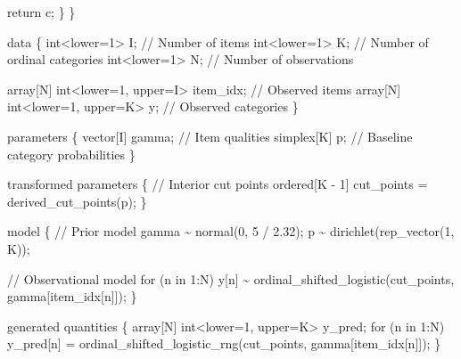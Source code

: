 \documentclass[
  letterpaper,
  DIV=11,
  numbers=noendperiod]{scrartcl}
\newenvironment{Shaded}{\begin{snugshade}}{\end{snugshade}}
\newcommand{\CommentTok}[1]{\textcolor[rgb]{0.37,0.37,0.37}{#1}}
\newcommand{\ControlFlowTok}[1]{\textcolor[rgb]{0.00,0.23,0.31}{#1}}
\newcommand{\DataTypeTok}[1]{\textcolor[rgb]{0.68,0.00,0.00}{#1}}
\newcommand{\DecValTok}[1]{\textcolor[rgb]{0.68,0.00,0.00}{#1}}
\newcommand{\FloatTok}[1]{\textcolor[rgb]{0.68,0.00,0.00}{#1}}
\newcommand{\KeywordTok}[1]{\textcolor[rgb]{0.00,0.23,0.31}{#1}}
\newcommand{\NormalTok}[1]{\textcolor[rgb]{0.00,0.23,0.31}{#1}}
\begin{document}
\begin{codelisting}
\begin{Shaded}
\begin{Highlighting}[]
    \ControlFlowTok{return}\NormalTok{ c;}
\NormalTok{  \}}
\NormalTok{\}}

\KeywordTok{data}\NormalTok{ \{}
  \DataTypeTok{int}\NormalTok{\textless{}}\KeywordTok{lower}\NormalTok{=}\DecValTok{1}\NormalTok{\textgreater{} I; }\CommentTok{// Number of items}
  \DataTypeTok{int}\NormalTok{\textless{}}\KeywordTok{lower}\NormalTok{=}\DecValTok{1}\NormalTok{\textgreater{} K; }\CommentTok{// Number of ordinal categories}
  \DataTypeTok{int}\NormalTok{\textless{}}\KeywordTok{lower}\NormalTok{=}\DecValTok{1}\NormalTok{\textgreater{} N; }\CommentTok{// Number of observations}

  \DataTypeTok{array}\NormalTok{[N] }\DataTypeTok{int}\NormalTok{\textless{}}\KeywordTok{lower}\NormalTok{=}\DecValTok{1}\NormalTok{, }\KeywordTok{upper}\NormalTok{=I\textgreater{} item\_idx; }\CommentTok{// Observed items}
  \DataTypeTok{array}\NormalTok{[N] }\DataTypeTok{int}\NormalTok{\textless{}}\KeywordTok{lower}\NormalTok{=}\DecValTok{1}\NormalTok{, }\KeywordTok{upper}\NormalTok{=K\textgreater{} y;        }\CommentTok{// Observed categories}
\NormalTok{\}}

\KeywordTok{parameters}\NormalTok{ \{}
  \DataTypeTok{vector}\NormalTok{[I] gamma; }\CommentTok{// Item qualities}
  \DataTypeTok{simplex}\NormalTok{[K] p;    }\CommentTok{// Baseline category probabilities}
\NormalTok{\}}

\KeywordTok{transformed parameters}\NormalTok{ \{}
  \CommentTok{// Interior cut points}
  \DataTypeTok{ordered}\NormalTok{[K {-} }\DecValTok{1}\NormalTok{] cut\_points = derived\_cut\_points(p);}
\NormalTok{\}}

\KeywordTok{model}\NormalTok{ \{}
  \CommentTok{// Prior model}
\NormalTok{  gamma \textasciitilde{} normal(}\DecValTok{0}\NormalTok{, }\DecValTok{5}\NormalTok{ / }\FloatTok{2.32}\NormalTok{);}
\NormalTok{  p \textasciitilde{} dirichlet(rep\_vector(}\DecValTok{1}\NormalTok{, K));}

  \CommentTok{// Observational model}
  \ControlFlowTok{for}\NormalTok{ (n }\ControlFlowTok{in} \DecValTok{1}\NormalTok{:N)}
\NormalTok{    y[n] \textasciitilde{} ordinal\_shifted\_logistic(cut\_points, gamma[item\_idx[n]]);}
\NormalTok{\}}

\KeywordTok{generated quantities}\NormalTok{ \{}
  \DataTypeTok{array}\NormalTok{[N] }\DataTypeTok{int}\NormalTok{\textless{}}\KeywordTok{lower}\NormalTok{=}\DecValTok{1}\NormalTok{, }\KeywordTok{upper}\NormalTok{=K\textgreater{} y\_pred;}
  \ControlFlowTok{for}\NormalTok{ (n }\ControlFlowTok{in} \DecValTok{1}\NormalTok{:N)}
\NormalTok{    y\_pred[n] = ordinal\_shifted\_logistic\_rng(cut\_points,}
\NormalTok{                                             gamma[item\_idx[n]]);}
\NormalTok{\}}
\end{Highlighting}
\end{Shaded}

\end{codelisting}
\end{document}
